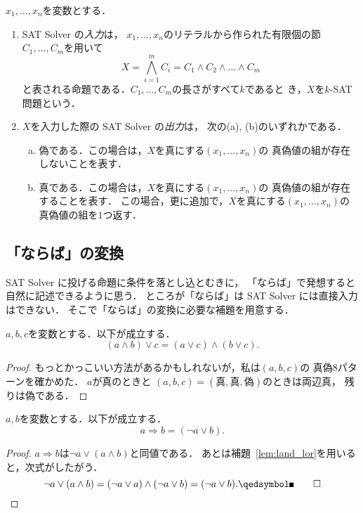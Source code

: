 \begin{defn}
 $x_1, \dots, x_n$を変数とする．
 \begin{enumerate}[1.]
  \item SAT Solver の\emph{入力}は，
        $x_1, \dots, x_n$のリテラルから作られた有限個の節
        $C_1, \dots, C_m$を用いて
        \[
        X = \bigwedge_{i=1}^m C_i = C_1 \land C_2 \land \dots \land C_m
        \]
        と表される命題である．$C_1, \dots, C_m$の長さがすべて$k$であると
        き，$X$を{\futoji $k$-SAT 問題}という．
  \item $X$を入力した際の SAT Solver の\emph{出力}は，
        次の(a), (b)のいずれかである．
        \begin{enumerate}[(a)]
         \item 偽である．この場合は，$X$を真にする$(x_1, \dots, x_n)$の
               真偽値の組が存在しないことを表す．
         \item 真である．この場合は，$X$を真にする$(x_1, \dots, x_n)$の
               真偽値の組が存在することを表す．
               この場合，更に追加で，$X$を真にする$(x_1, \dots, x_n)$の
               真偽値の組を$1$つ返す．
        \end{enumerate} 
 \end{enumerate}
\end{defn}

\subsection{「ならば」の変換}

SAT Solver に投げる命題に条件を落とし込とむきに，
「ならば」で発想すると自然に記述できるように思う．
ところが「ならば」は SAT Solver には直接入力はできない．
そこで「ならば」の変換に必要な補題を用意する．

\begin{lem} \label{lem:land_lor}
 $a, b, c$を変数とする．以下が成立する．
 \[
 (a \land b) \lor c = (a \lor c) \land (b \lor c).
 \]
\end{lem}

\begin{proof}
 もっとかっこいい方法があるかもしれないが，私は$(a, b, c)$の
 真偽$8$パターンを確かめた．
 $a$が真のときと
 $(a, b, c) = (\text{真}, \text{真}, \text{偽})$のときは両辺真，
 残りは偽である．\qedhere
\end{proof}

\begin{cor} \label{cor:rightarrow}
 $a, b$を変数とする．以下が成立する．
 \[
  a \Rightarrow b = (\lnot a \lor b).
 \]
\end{cor}

\begin{proof}
 $a \Rightarrow b$は$\lnot a \lor (a \land b)$と同値である．
 あとは補題~\ref{lem:land_lor}を用いると，次式がしたがう．
 \[
  \lnot a \lor (a \land b) = (\lnot a \lor a) \land (\lnot a \lor b)
 = (\lnot a \lor b). \qedhere
 \]
\end{proof}

